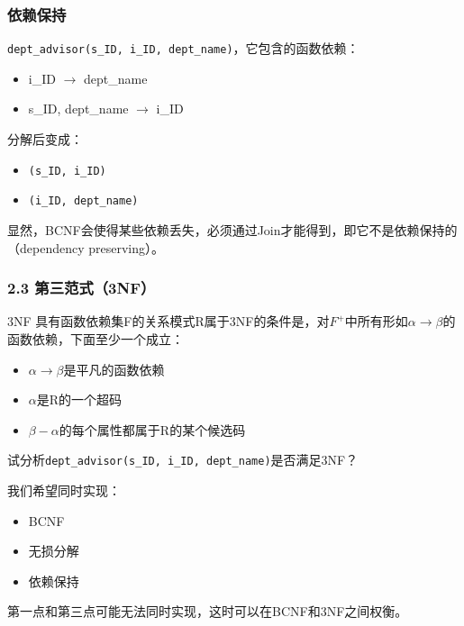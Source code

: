 \documentclass[aspectratio=169, 14pt]{beamer}
\begin{document}
\begin{frame}
    \frametitle{依赖保持}
\texttt{dept\_advisor(s\_ID, i\_ID, dept\_name)}，它包含的函数依赖：

\begin{itemize}
    \item i\_ID $\rightarrow$ dept\_name
    \item s\_ID, dept\_name $\rightarrow$ i\_ID
\end{itemize}
    
分解后变成：

\begin{itemize}
    \item \texttt{(s\_ID, i\_ID)}
    \item \texttt{(i\_ID, dept\_name)}
\end{itemize}

显然，BCNF会使得某些依赖丢失，必须通过Join才能得到，即它不是\alert{依赖保持}的（dependency preserving）。
\end{frame}


\begin{frame}
    \frametitle{2.3 第三范式（3NF）}
\begin{exampleblock}{3NF}
    具有函数依赖集F的关系模式R属于3NF的条件是，对$F^+$中所有形如$\alpha \rightarrow \beta$的函数依赖，下面至少一个成立：
    \begin{itemize}
        \item $\alpha \rightarrow \beta$是平凡的函数依赖
        \item $\alpha$是R的一个超码
        \item $\beta - \alpha$的每个属性都属于R的某个候选码
    \end{itemize}    
\end{exampleblock}
 试分析\texttt{dept\_advisor(s\_ID, i\_ID, dept\_name)}是否满足3NF？
\end{frame}

{
\begin{frame}[standout]
我们希望同时实现：

\begin{itemize}
    \item BCNF
    \item 无损分解
    \item 依赖保持
\end{itemize}

{\small 第一点和第三点可能无法同时实现，这时可以在BCNF和3NF之间权衡。}
\end{frame}
}
\end{document}
